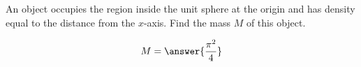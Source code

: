 \documentclass{ximera}
\author{David Guichard \and Neal Koblitz \and H. Jerome Keisler \and Albert Scheller \and Barry Balof \and Mike Wills \and Matthew Carr}
\begin{document}
\begin{exercise}




An object occupies the region inside the unit sphere at the origin and has density equal to the distance from the $x$-axis. Find the mass $M$ of this object. 
\begin{prompt}
\[
M=\answer{\frac{\pi^2}{4}}
\]
\end{prompt}



\end{exercise}
\end{document}
